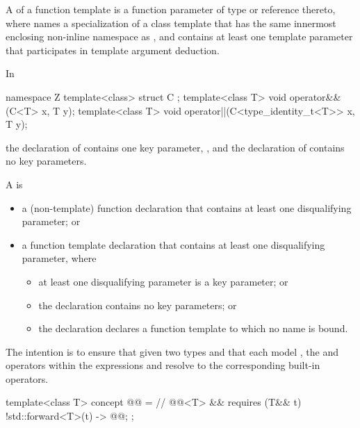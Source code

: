 \pnum
{}%
A  of a function template 
is a function parameter of type \cv{}  or reference thereto,
where  names a specialization of a class template that
has the same innermost enclosing non-inline namespace as , and
 contains at least one template parameter that
participates in template argument deduction.
\begin{example}
In
\begin{codeblock}
namespace Z {
  template<class> struct C {};
  template<class T>
    void operator&&(C<T> x, T y);
  template<class T>
    void operator||(C<type_identity_t<T>> x, T y);
}
\end{codeblock}
the declaration of 
contains one key parameter, , and
the declaration of 
contains no key parameters.
\end{example}

\pnum
A  is
\begin{itemize}
\item
a (non-template) function declaration that
contains at least one disqualifying parameter; or

\item
a function template declaration that
contains at least one disqualifying parameter, where
\begin{itemize}
\item at least one disqualifying parameter is a key parameter; or
\item the declaration contains no key parameters; or
\item the declaration declares a function template
to which no name is bound.
\end{itemize}
\end{itemize}

\pnum
\begin{note}
The intention is to ensure that
given two types  and 
that each model ,
the \tcode{\&\&} and \tcode{||} operators within the expressions
 and
resolve to the corresponding built-in operators.
\end{note}

\begin{itemdecl}
template<class T>
  concept @@ =                // \expos
    @@<T> && requires (T&& t) {
      { !std::forward<T>(t) } -> @@;
    };
\end{itemdecl}

